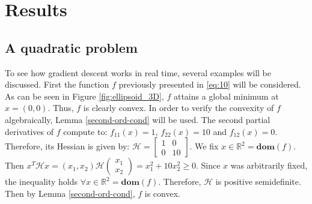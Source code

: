 \section{Results}
\subsection{A quadratic problem}
To see how gradient descent works in real time, several examples will be discussed. First the function $f$ previously presented in \eqref{eq:10} will be considered. As can be seen in Figure \ref{fig:ellipsoid_3D}, $f$ attains a global minimum at $x = (0,0).$ Thus, $f$ is clearly convex. In order to verify the convexity of $f$ algebraically, Lemma \ref{second-ord-cond} will be used. The second partial derivatives of $f$ compute to: $f_{11}(x) = 1$, $f_{22}(x) = 10$ and $f_{12}(x) = 0.$ Therefore, its Hessian is given by: $
\mathcal{H} = 
\begin{bmatrix}
1 & 0 \\
0 & 10 
\end{bmatrix}
$.
We fix $x \in \mathbb{R}^{2}=\textbf{dom} (f).$ Then $x^{T} \mathcal{H} x = (x_{1}, x_{2}) \mathcal{H}  
\begin{pmatrix}
    x_{1} \\
    x_{2} 
\end{pmatrix}
= x_{1}^{2} + 10x_{2}^{2} \geq 0.
$
Since $x$ was arbitrarily fixed, the inequality holds $\forall x \in \mathbb{R}^{2} = \textbf{dom} (f).$ Therefore, $\mathcal{H}$ is positive semidefinite. Then by Lemma \ref{second-ord-cond}, $f$ is convex.
